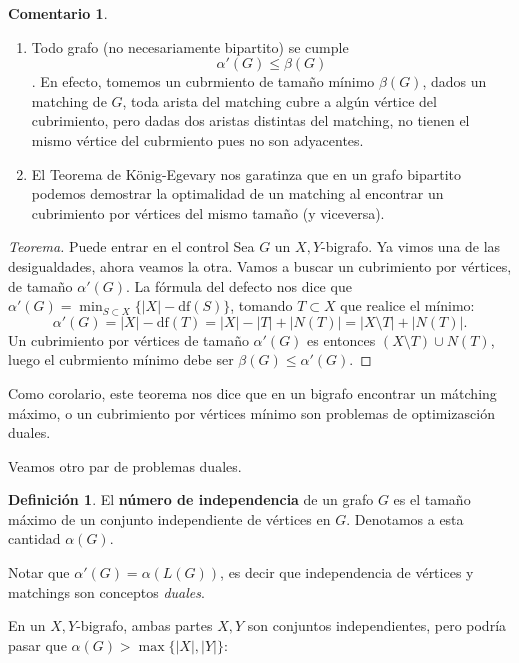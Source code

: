 \documentclass[12pt]{report}
\theoremstyle{plain}
\theoremstyle{definition}
\newtheorem{definition}[theorem]{Definición}
\newtheorem{remark}[theorem]{Comentario}
\newenvironment{Remark}{\colorlet{shadecolor}{Orchid!12} \begin{shaded} \begin{remark}}{ \end{remark} \end{shaded}}
\newcommand{\red}[1]{\textcolor{BrickRed}{#1}}
\newcommand{\abs}[1]{\left \vert #1 \right \vert}
\newcommand{\defecto}[1]{\mathrm{df}(#1)}
\begin{document}
\begin{Remark}
\begin{enumerate}
\item Todo grafo (no necesariamente bipartito) se cumple \[ \alpha' (G) \leq \beta (G)\]. En efecto, tomemos un cubrmiento de tamaño mínimo $\beta (G)$, dados un matching de $G$, toda arista del matching cubre a algún vértice del cubrimiento, pero dadas dos aristas distintas del matching, no tienen el mismo vértice del cubrmiento pues no son adyacentes.
\item El Teorema de König-Egevary nos garatinza que en un grafo bipartito podemos demostrar la optimalidad de un matching al encontrar un cubrimiento por vértices del mismo tamaño (y viceversa).
\end{enumerate}
\end{Remark}

\begin{proof}[Teorema]\red{Puede entrar en el control}
Sea $G$ un $X,Y$-bigrafo. Ya vimos una de las desigualdades, ahora veamos la otra. Vamos a buscar un cubrimiento por vértices, de tamaño $\alpha' (G)$. La fórmula del defecto nos dice que $\alpha' (G) = \min_{S \subset X} \{ \abs X - \defecto S \}$, tomando $T \subset X$ que realice el mínimo:
\[
    \alpha ' (G) = \abs X - \defecto T = \abs X - \abs T + \abs{ N(T)} = \abs{X \setminus T} + \abs {N(T)}.
\]
Un cubrimiento por vértices de tamaño $\alpha ' (G)$ es entonces $(X \setminus T) \cup N(T)$, luego el cubrmiento mínimo debe ser $\beta (G) \leq \alpha ' (G)$.
\end{proof}

Como corolario, este teorema nos dice que en un bigrafo encontrar un mátching máximo, o un cubrimiento por vértices mínimo son problemas de optimizasción duales.

\bigskip

Veamos otro par de problemas duales.

\begin{definition}
El \textbf{número de independencia} de un grafo $G$ es el tamaño máximo de un conjunto independiente de vértices en $G$. Denotamos a esta cantidad $\alpha (G)$.
\end{definition}
Notar que $\alpha ' (G) = \alpha (L(G))$, es decir que independencia de vértices y matchings son conceptos \textit{duales}.

En un $X,Y$-bigrafo, ambas partes $X,Y$ son conjuntos independientes, pero podría pasar que $\alpha (G) > \max \{ \abs X, \abs Y \}$:
\end{document}
